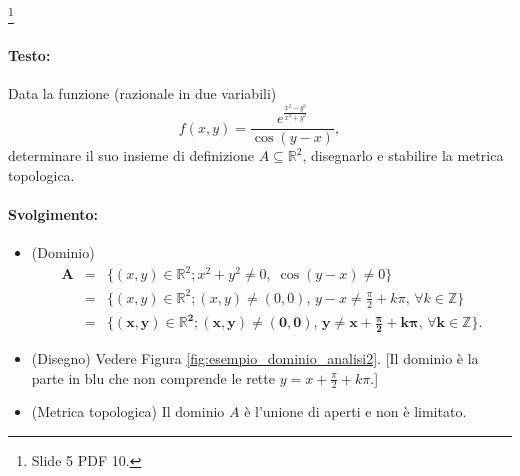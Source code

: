 \begin{example}\footnote{Slide 5 PDF 10.}
    \paragraph{Testo:} Data la funzione (razionale in due variabili)
    \begin{equation*}
        f(x,y)=\frac{e^{\frac{x^2-y^3}{x^2+y^2}}}{\cos(y-x)},
    \end{equation*}
    determinare il suo insieme di definizione $A\subseteq\mathbb R^2$, disegnarlo e stabilire la metrica topologica.
    \paragraph{Svolgimento:}
    \begin{itemize}
        \item (Dominio)
        \begin{equation*}
            \begin{matrix}
                \boldsymbol A&=&\{(x,y)\in\mathbb R^2;x^2+y^2\neq 0,\; \cos(y-x)\neq 0\}\\
                &=&\{(x,y)\in\mathbb R^2;(x,y)\neq(0,0),\, y-x\neq \frac{\pi}{2}+k\pi,\, \forall k\in\mathbb Z\}\\
                &=&\boldsymbol{\{(x,y)\in\mathbb R^2;(x,y)\neq(0,0),\, y\neq x + \frac{\pi}{2}+k\pi,\, \forall k\in\mathbb Z\}}.
            \end{matrix}
        \end{equation*}
        \item (Disegno) Vedere Figura \ref{fig:esempio_dominio_analisi2}. [Il dominio è la parte in blu che non comprende le rette $y=x+\frac{\pi}{2}+k\pi$.]
        \item (Metrica topologica) Il dominio $A$ è l'unione di aperti e non è limitato.
    \end{itemize}
    \begin{figure}
    \centering
\end{figure}
\end{example}
